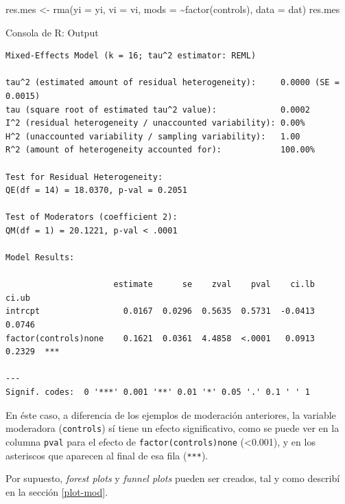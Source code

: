 \documentclass[
  bookmarksnumbered]{article}
\newenvironment{Shaded}{\begin{snugshade}}{\end{snugshade}}
\newcommand{\AttributeTok}[1]{\textcolor[rgb]{0.00,0.34,0.68}{#1}}
\newcommand{\FunctionTok}[1]{\textcolor[rgb]{0.39,0.29,0.61}{#1}}
\newcommand{\NormalTok}[1]{\textcolor[rgb]{0.12,0.11,0.11}{#1}}
\newcommand{\OtherTok}[1]{\textcolor[rgb]{0.00,0.43,0.16}{#1}}
\newcommand{\SpecialCharTok}[1]{\textcolor[rgb]{0.24,0.68,0.91}{#1}}
\begin{document}
\begin{Shaded}
\begin{Highlighting}[]
\NormalTok{res.mes }\OtherTok{\textless{}{-}} \FunctionTok{rma}\NormalTok{(}\AttributeTok{yi =}\NormalTok{ yi, }\AttributeTok{vi =}\NormalTok{ vi, }\AttributeTok{mods =} \SpecialCharTok{\textasciitilde{}}\FunctionTok{factor}\NormalTok{(controls), }\AttributeTok{data =}\NormalTok{ dat)}
\NormalTok{res.mes}
\end{Highlighting}
\end{Shaded}

\begin{ROut}{Consola de R: Output~\thetcbcounter}
                \begin{footnotesize}
                \begin{verbatim} 
Mixed-Effects Model (k = 16; tau^2 estimator: REML)

tau^2 (estimated amount of residual heterogeneity):     0.0000 (SE = 0.0015)
tau (square root of estimated tau^2 value):             0.0002
I^2 (residual heterogeneity / unaccounted variability): 0.00%
H^2 (unaccounted variability / sampling variability):   1.00
R^2 (amount of heterogeneity accounted for):            100.00%

Test for Residual Heterogeneity:
QE(df = 14) = 18.0370, p-val = 0.2051

Test of Moderators (coefficient 2):
QM(df = 1) = 20.1221, p-val < .0001

Model Results:

                      estimate      se    zval    pval    ci.lb   ci.ub 
intrcpt                 0.0167  0.0296  0.5635  0.5731  -0.0413  0.0746      
factor(controls)none    0.1621  0.0361  4.4858  <.0001   0.0913  0.2329  *** 

---
Signif. codes:  0 '***' 0.001 '**' 0.01 '*' 0.05 '.' 0.1 ' ' 1
 \end{verbatim}
                \end{footnotesize}
                \end{ROut}

En éste caso, a diferencia de los ejemplos de moderación anteriores, la variable moderadora (\texttt{controls}) sí tiene un efecto significativo, como se puede ver en la columna \texttt{pval} para el efecto de \texttt{factor(controls)none} (\textless0.001), y en los asteriscos que aparecen al final de esa fila (\texttt{***}).

Por supuesto, \emph{forest plots} y \emph{funnel plots} pueden ser creados, tal y como describí en la sección \ref{plot-mod}.
\end{document}
